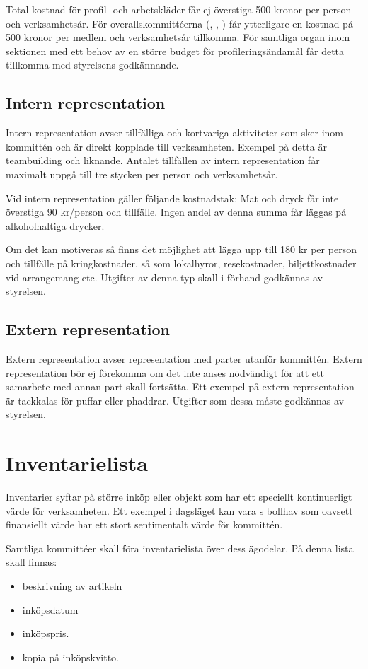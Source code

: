 \documentclass[11pt, includeaddress]{../../classes/cthit}
\begin{document}
Total kostnad för profil- och arbetskläder får ej överstiga 500 kronor per person och verksamhetsår. För overallskommittéerna (\NOLLKIT, \PRIT, \SEXIT) får ytterligare en kostnad på 500 kronor per medlem och verksamhetsår tillkomma. För samtliga organ inom sektionen med ett behov av en större budget för profileringsändamål får detta tillkomma med styrelsens godkännande.

\subsection{Intern representation}
Intern representation avser tillfälliga och kortvariga aktiviteter som sker inom kommittén och är direkt kopplade till verksamheten. Exempel på detta är teambuilding och liknande. Antalet tillfällen av intern representation får maximalt uppgå till tre stycken per person och verksamhetsår. 

Vid intern representation gäller följande kostnadstak: Mat och dryck får inte överstiga 90 kr/person och tillfälle. Ingen andel av denna summa får läggas på alkoholhaltiga drycker. 

Om det kan motiveras så finns det möjlighet att lägga upp till 180 kr per person och tillfälle på kringkostnader, så som lokalhyror, resekostnader, biljettkostnader vid arrangemang etc. Utgifter av denna typ skall i förhand godkännas av styrelsen.

\subsection{Extern representation}
Extern representation avser representation med parter utanför kommittén. Extern representation bör ej förekomma om det inte anses nödvändigt för att ett samarbete med annan part skall fortsätta. Ett exempel på extern representation är tackkalas för puffar eller phaddrar. Utgifter som dessa måste godkännas av styrelsen.

\section{Inventarielista}
Inventarier syftar på större inköp eller objekt som har ett speciellt kontinuerligt värde för verksamheten. Ett exempel i dagsläget kan vara \NOLLKIT{}s bollhav som oavsett finansiellt värde har ett stort sentimentalt värde för kommittén. 

Samtliga kommittéer skall föra inventarielista över dess ägodelar. På denna lista skall finnas:
\begin{itemize} 
	\item beskrivning av artikeln
	\item inköpsdatum
	\item inköpspris. 
	\item kopia på inköpskvitto.
\end{itemize}
\end{document}
